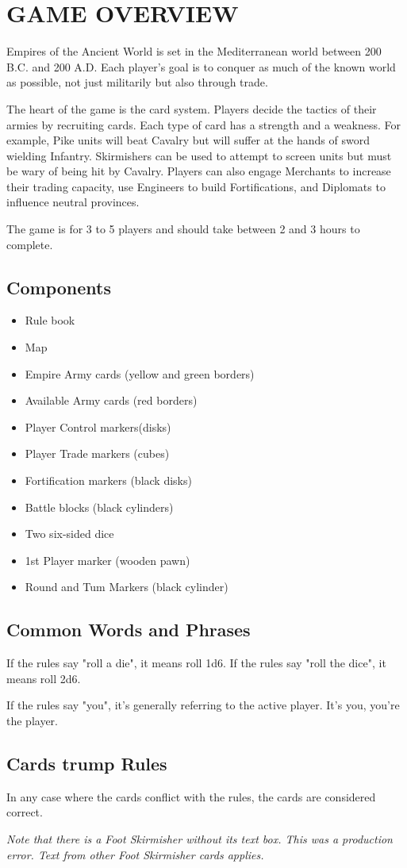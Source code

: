 \section{GAME OVERVIEW}

Empires of the Ancient World is set in the Mediterranean world between 200 B.C. and 200 A.D. Each player’s goal is to conquer as much of the known world as possible, not just militarily but also through trade.

The heart of the game is the card system. Players decide the tactics of their armies by recruiting cards. Each type of card has a strength and a weakness. For example, Pike units will beat Cavalry but will suffer at the hands of sword wielding Infantry. Skirmishers can be used to attempt to screen units but must be wary of being hit by Cavalry. Players can also engage Merchants to increase their trading capacity, use Engineers to build Fortifications, and Diplomats to influence neutral provinces.

The game is for 3 to 5 players and should take between 2 and 3 hours to complete.

\subsection{Components}

\begin{itemize}[nosep]
  \item Rule book
  \item Map
  \item Empire Army cards (yellow and green borders)
  \item Available Army cards (red borders)
  \item Player Control markers(disks)
  \item Player Trade markers (cubes)
  \item Fortification markers (black disks)
  \item Battle blocks (black cylinders)
  \item Two six-sided dice
  \item 1st Player marker (wooden pawn)
  \item Round and Tum Markers (black cylinder)
\end{itemize}

\subsection{Common Words and Phrases}

If the rules say "roll a die", it means roll 1d6. If the rules say "roll the dice", it means roll 2d6.

If the rules say "you", it's generally referring to the active player. It's you, you're the player.

\subsection{Cards trump Rules}

In any case where the cards conflict with the rules, the cards are considered correct.

\textit{Note that there is a Foot Skirmisher without its text box. This was a production error. Text from other Foot Skirmisher cards applies.}
